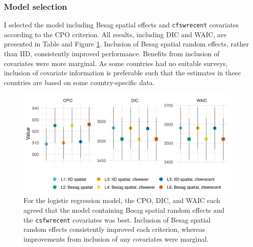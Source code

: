 \documentclass[a4paper, nobind]{templates/ociamthesis}
\begin{document}
\hypertarget{model-selection-1}{%
\subsubsection{Model selection}\label{model-selection-1}}

I selected the model including Besag spatial effects and \texttt{cfswrecent} covariates according to the CPO criterion.
All results, including DIC and WAIC, are presented in Table and Figure \ref{fig:fsw-logit-model-comparison}.
Inclusion of Besag spatial random effects, rather than IID, consistently improved performance.
Benefits from inclusion of covariates were more marginal.
As some countries had no suitable surveys, inclusion of covariate information is preferable such that the estimates in these countries are based on some country-specific data.



\begin{figure}

{\centering \includegraphics[width=0.95\linewidth]{resources/multi-agyw/20230627-144735-3da88508/depends/fsw-logit-model-comparison} 

}

\caption{For the logistic regression model, the CPO, DIC, and WAIC each agreed that the model containing Besag spatial random effects and the \texttt{csfwrecent} covariates was best. Inclusion of Besag spatial random effects consistently improved each criterion, whereas improvements from inclusion of any covariates were marginal.}\label{fig:fsw-logit-model-comparison}
\end{figure}
\end{document}
